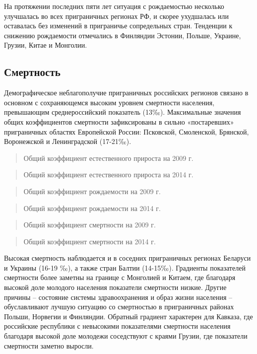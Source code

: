 \documentclass[]{book}
\begin{document}
На протяжении последних пяти лет ситуация с рождаемостью несколько
улучшалась во всех приграничных регионах РФ, и скорее ухудшалась или
оставалась без изменений в приграничье сопредельных стран. Тенденции к
снижению рождаемости отмечались в Финляндии Эстонии, Польше, Украине,
Грузии, Китае и Монголии.

\hypertarget{demo-situ-dea}{%
\subsection{Смертность}\label{demo-situ-dea}}

Демографическое неблагополучие приграничных российских регионов связано
в основном с сохраняющемся высоким уровнем смертности населения,
превышающим среднероссийский показатель (13‰). Максимальные значения
общих коэффициентов смертности зафиксированы в сильно «постаревших»
приграничных областях Европейской России: Псковской, Смоленской,
Брянской, Воронежской и Ленинградской (17-21‰).

\begin{quote}
Общий коэффициент естественного прироста на 2009 г.
\end{quote}

\begin{quote}
Общий коэффициент естественного прироста на 2014 г.
\end{quote}

\begin{quote}
Общий коэффициент рождаемости на 2009 г.
\end{quote}

\begin{quote}
Общий коэффициент рождаемости на 2014 г.
\end{quote}

\begin{quote}
Общий коэффициент смертности на 2009 г.
\end{quote}

\begin{quote}
Общий коэффициент смертности на 2014 г.
\end{quote}

Высокая смертность наблюдается и в соседних приграничных регионах
Беларуси и Украины (16-19 ‰), а также стран Балтии (14-15‰). Градиенты
показателей смертности более заметны на границе с Монголией и Китаем,
где благодаря высокой доле молодого населения показатели смертности
низкие. Другие причины -- состояние системы здравоохранения и образ
жизни населения -- обуславливают лучшую ситуацию со смертностью в
приграничных районах Польши, Норвегии и Финляндии. Обратный градиент
характерен для Кавказа, где российские республики с невысокими
показателями смертности населения благодаря высокой доле молодежи
соседствуют с краями Грузии, где показатели смертности заметно выросли.
\end{document}
